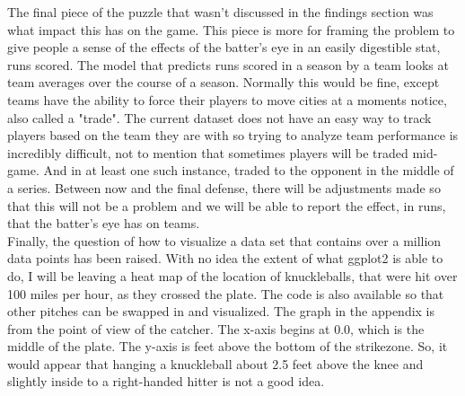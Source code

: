 \documentclass{article}
\begin{document}
\begin{doublespace}
The final piece of the puzzle that wasn't discussed in the findings section was what impact this has on the game. This piece is more for framing the problem to give people a sense of the effects of the batter's eye in an easily digestible stat, runs scored. The model that predicts runs scored in a season by a team looks at team averages over the course of a season. Normally this would be fine, except teams have the ability to force their players to move cities at a moments notice, also called a "trade". The current dataset does not have an easy way to track players based on the team they are with so trying to analyze team performance is incredibly difficult, not to mention that sometimes players will be traded mid-game. And in at least one such instance, traded to the opponent in the middle of a series. Between now and the final defense, there will be adjustments made so that this will not be a problem and we will be able to report the effect, in runs, that the batter's eye has on teams. \\ 

Finally, the question of how to visualize a data set that contains over a million data points has been raised. With no idea the extent of what ggplot2 is able to do, I will be leaving a heat map of the location of knuckleballs, that were hit over 100 miles per hour, as they crossed the plate. The code is also available so that other pitches can be swapped in and visualized. The graph in the appendix is from the point of view of the catcher. The x-axis begins at 0.0, which is the middle of the plate. The y-axis is feet above the bottom of the strikezone. So, it would appear that hanging a knuckleball about 2.5 feet above the knee and slightly inside to a right-handed hitter is not a good idea.


\end{doublespace}

\pagebreak
\end{document}
